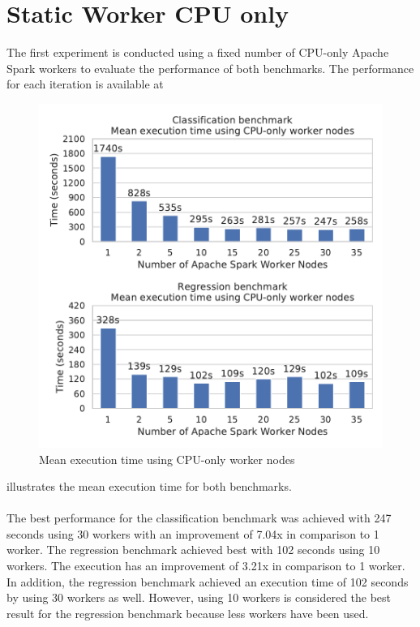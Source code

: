 \section{Static Worker CPU only}
\label{sec:07_static}
The first experiment is conducted using a fixed number of CPU-only Apache Spark workers to evaluate the performance of both benchmarks.
The performance for each iteration is available at %
\begin{figure}[h]
\centering
\includegraphics[scale=0.9]{images/07_evaluation/overall_cpu}
\caption{Mean execution time using CPU-only worker nodes}
\label{fig:07_static_results}
\end{figure}
 illustrates the mean execution time for both benchmarks.

\paragraph{}
The best performance for the classification benchmark was achieved with 247 seconds using 30 workers with an improvement of 7.04x in comparison to 1 worker. The regression benchmark achieved best with 102 seconds using 10 workers. The execution has an improvement of 3.21x in comparison to 1 worker. In addition, the regression benchmark achieved an execution time of 102 seconds by using 30 workers as well. However, using 10 workers is considered the best result for the regression benchmark because less workers have been used.

